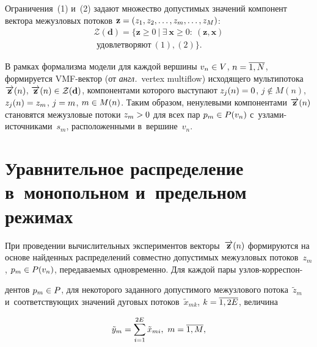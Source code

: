 \begin{multicols}{2}
Ограничения~(1) и~(2) задают множество  до\-пус\-ти\-мых значений компонент вектора 
межузловых потоков
$\mathbf{z} \hm= (z_1, z_2, \ldots, z_m, \ldots, z_M)$:
\begin{multline*} 
\mathcal{Z}(\mathbf{d}) = \{\mathbf{z} \ge 0 \ |\  \exists \ \mathbf{x} \ge 0: \ 
(\mathbf{z}, \mathbf{x}) \\
 \mbox{ удовлетворяют}\ (1), (2)\}.
\end{multline*}

В рамках формализма модели для каждой вершины $v_n \hm\in V$, $n \hm= \ol{1, N}$, 
формируется VMF-век\-тор (от \textit{англ.}\ vertex multiflow) исходящего мультипотока 
$\overrightarrow{\mathbf{z}}(n)$, $\ora{\mathbf{z}}(n)\hm \in \mathcal{Z}(\mathbf{d})$, 
компонентами которого выступают $z_j(n) \hm= 0$, $j \not \in M(n)$, $z_j(n) \hm= z_m$, 
$j \hm= m$, $m \hm\in M(n)$. Таким образом, ненулевыми компонентами 
$\overrightarrow{\mathbf{z}}(n)$ становятся межузловые потоки $z_m\hm > 0$ для всех пар $p_m 
\hm\in P(v_n)$ с~уз\-ла\-ми-ис\-точ\-ни\-ками~$s_m$, расположенными в~вершине~$v_n$.

\vspace*{-9pt}

\section{Уравнительное распределение в~монопольном и~предельном режимах}

\vspace*{-2pt}

При проведении вычислительных экспериментов векторы~$\overrightarrow{\mathbf{z}}(n)$ 
формируются  на основе найденных распределений совместно до\-пус\-ти\-мых межузловых 
потоков~$z_m$, $p_m \hm\in P(v_n)$, передаваемых \mbox{одновременно}. Для каждой пары 
уз\-лов-кор\-рес\-пон-\linebreak\vspace*{-12pt}

\pagebreak

\noindent
ден\-тов $p_m \hm\in P$, для некоторого заданного допустимого 
межузлового потока~$\tilde{z}_m$ и~соответствующих значений дуговых потоков~$\tilde{x}_{mk}$,  $k\hm = \ol{1, 2E}$, \mbox{величина}

\vspace*{2pt}

\noindent
$$
\tilde{y}_m = \sum\limits_{i=1}^{2E} \tilde{x}_{mi}, \ m = \overline{1, M},
$$

\vspace*{-2pt}


\end{multicols}
